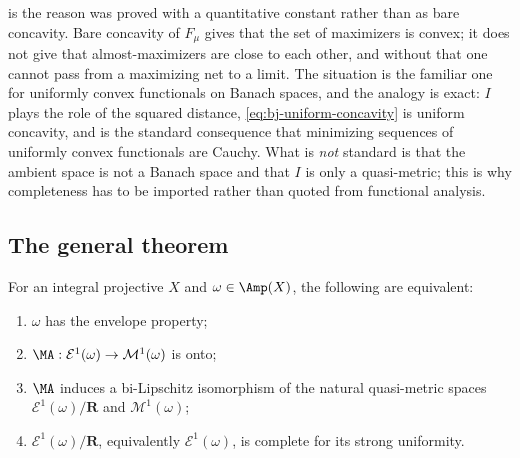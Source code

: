 \begin{remark}
\label{rem:ch47-cauchy-is-strict-concavity}
 is the reason
 was proved with a quantitative constant
rather than as bare concavity.  Bare concavity of $F_\mu$ gives that the
set of maximizers is convex; it does not give that almost-maximizers are
close to each other, and without that one cannot pass from a maximizing net
to a limit.  The situation is the familiar one for uniformly convex
functionals on Banach spaces, and the analogy is exact: $I$ plays the
role of the squared distance, \eqref{eq:bj-uniform-concavity} is uniform
concavity, and  is the standard
consequence that minimizing sequences of uniformly convex functionals are
Cauchy.  What is \emph{not} standard is that the ambient space is not a
Banach space and that $I$ is only a quasi-metric; this is why
completeness has to be imported rather than quoted from functional
analysis.
\end{remark}

\subsection{The general theorem}
\label{sec:ch47-general-cy}

\begin{theorem}\label{thm:bj-cy-envelope-equivalence}
For an integral projective $X$ and $\omega\in\Amp(X)$, the following
are equivalent:

\begin{enumerate}
\item $\omega$ has the envelope property;
\item $\MA:\mathcal E^1(\omega)\to\mathcal M^1(\omega)$ is onto;
\item $\MA$ induces a bi-Lipschitz isomorphism of the natural
      quasi-metric spaces $\mathcal E^1(\omega)/\mathbf R$ and
      $\mathcal M^1(\omega)$;
\item $\mathcal E^1(\omega)/\mathbf R$, equivalently
      $\mathcal E^1(\omega)$, is complete for its strong uniformity.
\end{enumerate}
\par
\end{theorem}


